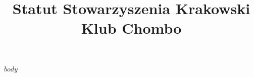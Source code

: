 \documentclass[a4paper,oneside,12pt]{article}
\title{\vspace{-2em}Statut Stowarzyszenia Krakowski Klub Chombo}
\author{}
\date{\vspace{-3em}}
\begin{document}
\maketitle

$body$
\end{document}
